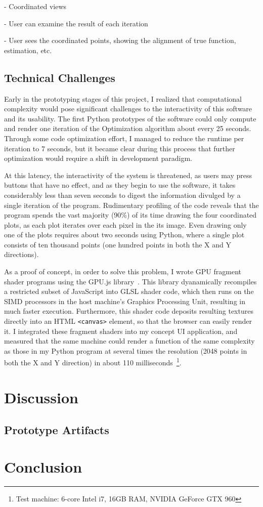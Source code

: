 \documentclass{vgtc}                          %
\begin{document}
- Coordinated views

- User can examine the result of each iteration

- User sees the coordinated points, showing the alignment of true function, estimation, etc.

\subsection{Technical Challenges}

Early in the prototyping stages of this project, I realized that computational
complexity would pose significant challenges to the interactivity of this
software and its usability. The first Python prototypes of the software could
only compute and render one iteration of the Optimization algorithm about every
25 seconds. Through some code optimization effort, I managed to reduce the
runtime per iteration to 7 seconds, but it became clear during this process
that further optimization would require a shift in development paradigm.

At this latency, the interactivity of the system is threatened, as users may
press buttons that have no effect, and as they begin to use the software, it
takes considerably less than seven seconds to digest the information divulged
by a single iteration of the program. Rudimentary profiling of the code reveals
that the program spends the vast majority (90\%) of its time drawing the four
coordinated plots, as each plot iterates over each pixel in the its image. Even
drawing only one of the plots requires about two seconds using Python, where a
single plot consists of ten thousand points (one hundred points in both the X
and Y directions).

As a proof of concept, in order to solve this problem, I wrote GPU fragment
shader programs using the GPU.js library~\cite{GPUjs}. This library
dyanamically recompiles a restricted subset of JavaScript into GLSL shader
code, which then runs on the SIMD processors in the host machine's Graphics
Processing Unit, resulting in much faster execution. Furthermore, this shader
code deposits resulting textures directly into an HTML \texttt{<canvas>}
element, so that the browser can easily render it. I integrated these fragment
shaders into my concept UI application, and measured that the same machine
could render a function of the same complexity as those in my Python program at
several times the resolution (2048 points in both the X and Y direction) in
about 110 milliseconds~\footnote{Test machine: 6-core Intel i7, 16GB RAM,
NVIDIA GeForce GTX 960}.

\section{Discussion}

\subsection{Prototype Artifacts}

\section{Conclusion}

%

%
%
%


\end{document}
